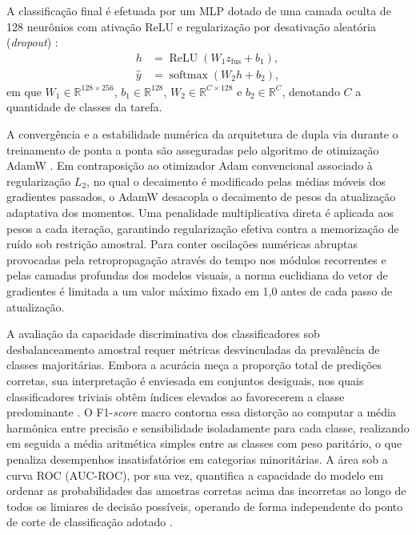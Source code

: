 A classificação final é efetuada por um MLP dotado de uma camada oculta de 128 neurônios com ativação ReLU e regularização por desativação aleatória (\textit{dropout}) \cite{rumelhart1986learning,srivastava2014dropout}:
\begin{align}
h &= \operatorname{ReLU}\!\left(W_1 z_{\mathrm{fus}} + b_1\right), \label{eq:mlp-oculta}\\
\hat{y} &= \operatorname{softmax}\!\left(W_2 h + b_2\right), \label{eq:mlp-saida}
\end{align}
em que $W_1 \in \mathbb{R}^{128 \times 256}$, $b_1 \in \mathbb{R}^{128}$, $W_2 \in \mathbb{R}^{C \times 128}$ e $b_2 \in \mathbb{R}^C$, denotando $C$ a quantidade de classes da tarefa.

A convergência e a estabilidade numérica da arquitetura de dupla via durante o treinamento de ponta a ponta são asseguradas pelo algoritmo de otimização AdamW \cite{loshchilov2019decoupled}. Em contraposição ao otimizador Adam convencional associado à regularização $L_2$, no qual o decaimento é modificado pelas médias móveis dos gradientes passados, o AdamW desacopla o decaimento de pesos da atualização adaptativa dos momentos. Uma penalidade multiplicativa direta é aplicada aos pesos a cada iteração, garantindo regularização efetiva contra a memorização de ruído sob restrição amostral. Para conter oscilações numéricas abruptas provocadas pela retropropagação através do tempo nos módulos recorrentes e pelas camadas profundas dos modelos visuais, a norma euclidiana do vetor de gradientes é limitada a um valor máximo fixado em 1,0 antes de cada passo de atualização.

A avaliação da capacidade discriminativa dos classificadores sob desbalanceamento amostral requer métricas desvinculadas da prevalência de classes majoritárias. Embora a acurácia meça a proporção total de predições corretas, sua interpretação é enviesada em conjuntos desiguais, nos quais classificadores triviais obtêm índices elevados ao favorecerem a classe predominante \cite{sokolova2009systematic}. O F1-\textit{score} macro contorna essa distorção ao computar a média harmônica entre precisão e sensibilidade isoladamente para cada classe, realizando em seguida a média aritmética simples entre as classes com peso paritário, o que penaliza desempenhos insatisfatórios em categorias minoritárias. A área sob a curva ROC (AUC-ROC), por sua vez, quantifica a capacidade do modelo em ordenar as probabilidades das amostras corretas acima das incorretas ao longo de todos os limiares de decisão possíveis, operando de forma independente do ponto de corte de classificação adotado \cite{fawcett2006introduction}.

